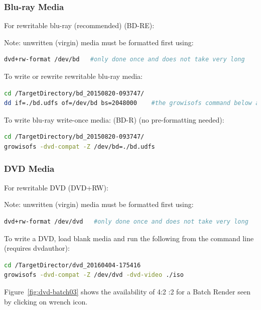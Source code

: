 \subsubsection*{Blu-ray Media}
\label{ssub:bluray_media}

For rewritable blu-ray (recommended) (BD-RE):

Note: unwritten (virgin) media must be formatted first using:

\begin{lstlisting}[language=bash,numbers=none]
dvd+rw-format /dev/bd   #only done once and does not take very long
\end{lstlisting}

To write or rewrite rewritable blu-ray media:

\begin{lstlisting}[language=bash,numbers=none]
cd /TargetDirectory/bd_20150820-093747/
dd if=./bd.udfs of=/dev/bd bs=2048000    #the growisofs command below also works
\end{lstlisting}

To write blu-ray write-once media: (BD-R)  (no pre-formatting needed):

\begin{lstlisting}[language=bash,numbers=none]
cd /TargetDirectory/bd_20150820-093747/
growisofs -dvd-compat -Z /dev/bd=./bd.udfs
\end{lstlisting}

\subsubsection*{DVD Media}
\label{ssub:dvd_media}

For rewritable DVD (DVD+RW):

Note: unwritten (virgin) media must be formatted first using:

\begin{lstlisting}[language=bash,numbers=none]
dvd+rw-format /dev/dvd   #only done once and does not take very long
\end{lstlisting}

To write a DVD, load blank media and run the following from the command line (requires dvdauthor):

\begin{lstlisting}[language=bash,numbers=none]
cd /TargetDirector/dvd_20160404-175416
growisofs -dvd-compat -Z /dev/dvd -dvd-video ./iso
\end{lstlisting}

Figure~\ref{fig:dvd-batch03} shows the availability of 4:2 :2 for a Batch Render seen by clicking on wrench icon.

